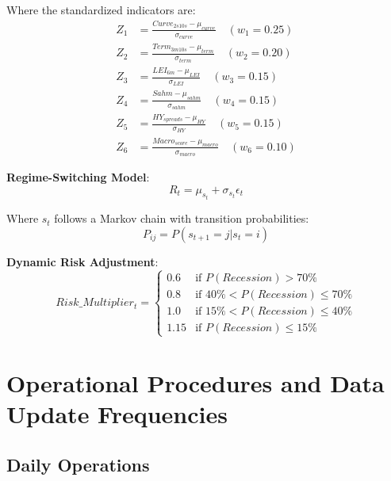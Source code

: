 \documentclass[12pt,a4paper]{article}
\begin{document}
Where the standardized indicators are:
\begin{align}
Z_1 &= \frac{Curve_{2s10s} - \mu_{curve}}{\sigma_{curve}} \quad (w_1 = 0.25) \\
Z_2 &= \frac{Term_{3m10s} - \mu_{term}}{\sigma_{term}} \quad (w_2 = 0.20) \\
Z_3 &= \frac{LEI_{6m} - \mu_{LEI}}{\sigma_{LEI}} \quad (w_3 = 0.15) \\
Z_4 &= \frac{Sahm - \mu_{sahm}}{\sigma_{sahm}} \quad (w_4 = 0.15) \\
Z_5 &= \frac{HY_{spreads} - \mu_{HY}}{\sigma_{HY}} \quad (w_5 = 0.15) \\
Z_6 &= \frac{Macro_{score} - \mu_{macro}}{\sigma_{macro}} \quad (w_6 = 0.10)
\end{align}

\textbf{Regime-Switching Model}:
\begin{equation}
R_t = \mu_{s_t} + \sigma_{s_t} \epsilon_t
\end{equation}

Where $s_t$ follows a Markov chain with transition probabilities:
\begin{equation}
P_{ij} = P(s_{t+1} = j | s_t = i)
\end{equation}

\textbf{Dynamic Risk Adjustment}:
\begin{equation}
Risk\_Multiplier_t = \begin{cases}
0.6 & \text{if } P(Recession) > 70\% \\
0.8 & \text{if } 40\% < P(Recession) \leq 70\% \\
1.0 & \text{if } 15\% < P(Recession) \leq 40\% \\
1.15 & \text{if } P(Recession) \leq 15\%
\end{cases}
\end{equation}

\section{Operational Procedures and Data Update Frequencies}

\subsection{Daily Operations}
\end{document}
